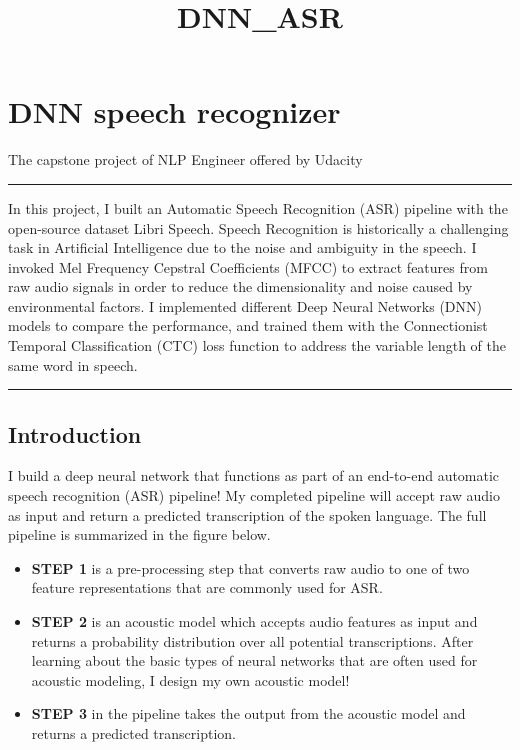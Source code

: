 \documentclass[11pt]{article}
\title{DNN\_ASR}
\providecommand{\tightlist}{%
      \setlength{\itemsep}{0pt}\setlength{\parskip}{0pt}}
\begin{document}
    
    
    \maketitle
    
    

    
    \section{DNN speech recognizer}\label{dnn-speech-recognizer}

The capstone project of NLP Engineer offered by Udacity

\begin{center}\rule{0.5\linewidth}{\linethickness}\end{center}

In this project, I built an Automatic Speech Recognition (ASR) pipeline
with the open-source dataset Libri Speech. Speech Recognition is
historically a challenging task in Artificial Intelligence due to the
noise and ambiguity in the speech. I invoked Mel Frequency Cepstral
Coefficients (MFCC) to extract features from raw audio signals in order
to reduce the dimensionality and noise caused by environmental factors.
I implemented different Deep Neural Networks (DNN) models to compare the
performance, and trained them with the Connectionist Temporal
Classification (CTC) loss function to address the variable length of the
same word in speech.

\begin{center}\rule{0.5\linewidth}{\linethickness}\end{center}

\subsection{Introduction}\label{introduction}

I build a deep neural network that functions as part of an end-to-end
automatic speech recognition (ASR) pipeline! My completed pipeline will
accept raw audio as input and return a predicted transcription of the
spoken language. The full pipeline is summarized in the figure below.

\begin{itemize}
\tightlist
\item
  \textbf{STEP 1} is a pre-processing step that converts raw audio to
  one of two feature representations that are commonly used for ASR.
\item
  \textbf{STEP 2} is an acoustic model which accepts audio features as
  input and returns a probability distribution over all potential
  transcriptions. After learning about the basic types of neural
  networks that are often used for acoustic modeling, I design my own
  acoustic model!
\item
  \textbf{STEP 3} in the pipeline takes the output from the acoustic
  model and returns a predicted transcription.
\end{itemize}
\end{document}
